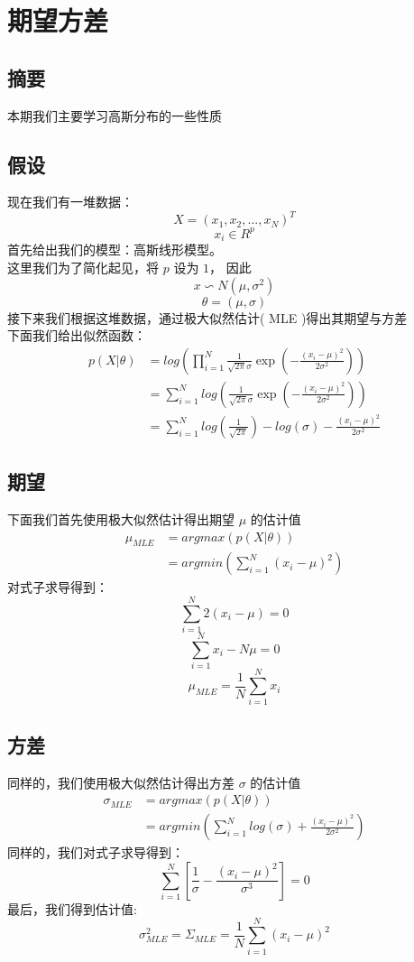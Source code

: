 \documentclass{report}
\begin{document}
\section{期望方差}
\subsection{摘要}
本期我们主要学习高斯分布的一些性质
\subsection{假设}
现在我们有一堆数据：
$$
X=(x_1, x_2, ..., x_N)^T
$$
$$
x_i \in R^p
$$
首先给出我们的模型：高斯线形模型。\\
这里我们为了简化起见，将 $p$ 设为 $1$， 因此 
$$
x \backsim N(\mu, \sigma^2)
$$
$$
\theta=(\mu, \sigma)
$$ 
接下来我们根据这堆数据，通过极大似然估计( MLE )得出其期望与方差\\
下面我们给出似然函数：
$$
\begin{aligned}
p(X|\theta)&=log(\prod_{i=1}^N \frac{1}{\sqrt{2\pi}\sigma} \exp(-\frac{(x_i-\mu)^2}{2\sigma^2})) \\
&=\sum_{i=1}^N log(\frac{1}{\sqrt{2\pi}\sigma} \exp(-\frac{(x_i-\mu)^2}{2\sigma^2}))\\
&=\sum_{i=1}^N log(\frac{1}{\sqrt{2\pi}}) - log(\sigma) - \frac{(x_i-\mu)^2}{2\sigma^2}
\end{aligned}
$$
\subsection{期望}
下面我们首先使用极大似然估计得出期望 $\mu$ 的估计值
$$
\begin{aligned}
\mu_{MLE}
&=argmax(p(X|\theta))\\
&=argmin(\sum_{i=1}^N (x_i-\mu)^2)
\end{aligned}
$$
对式子求导得到：
$$
\sum_{i=1}^N 2(x_i-\mu)=0
$$
$$
\sum_{i=1}^N x_i - N \mu=0
$$
$$
\mu_{MLE}=\frac{1}{N} \sum_{i=1}^N x_i
$$
\subsection{方差}
同样的，我们使用极大似然估计得出方差 $\sigma$ 的估计值
$$
\begin{aligned}
\sigma_{MLE}
&=argmax(p(X|\theta))\\
&=argmin(\sum_{i=1}^N log(\sigma)+\frac{(x_i-\mu)^2}{2\sigma^2})
\end{aligned}
$$
同样的，我们对式子求导得到：
$$
\sum_{i=1}^N[\frac{1}{\sigma}-\frac{(x_i-\mu)^2}{\sigma^3}]=0
$$
最后，我们得到估计值:
$$
\sigma_{MLE}^2 = \Sigma_{MLE} = \frac{1}{N} \sum_{i=1}^N (x_i-\mu)^2
$$
\end{document}
